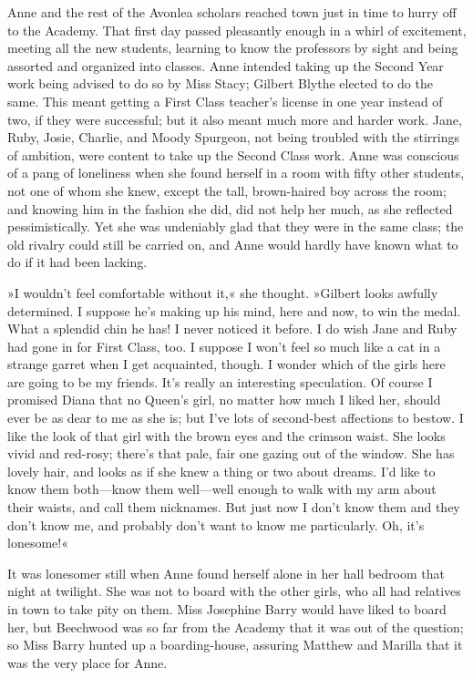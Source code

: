 Anne and the rest of the Avonlea scholars reached town just in time to hurry off to the Academy. That first day passed pleasantly enough in a whirl of excitement, meeting all the new students, learning to know the professors by sight and being assorted and organized into classes. Anne intended taking up the Second Year work being advised to do so by Miss Stacy; Gilbert Blythe elected to do the same. This meant getting a First Class teacher’s license in one year instead of two, if they were successful; but it also meant much more and harder work. Jane, Ruby, Josie, Charlie, and Moody Spurgeon, not being troubled with the stirrings of ambition, were content to take up the Second Class work. Anne was conscious of a pang of loneliness when she found herself in a room with fifty other students, not one of whom she knew, except the tall, brown-haired boy across the room; and knowing him in the fashion she did, did not help her much, as she reflected pessimistically. Yet she was undeniably glad that they were in the same class; the old rivalry could still be carried on, and Anne would hardly have known what to do if it had been lacking.

»I wouldn’t feel comfortable without it,« she thought. »Gilbert looks awfully determined. I suppose he’s making up his mind, here and now, to win the medal. What a splendid chin he has! I never noticed it before. I do wish Jane and Ruby had gone in for First Class, too. I suppose I won’t feel so much like a cat in a strange garret when I get acquainted, though. I wonder which of the girls here are going to be my friends. It’s really an interesting speculation. Of course I promised Diana that no Queen’s girl, no matter how much I liked her, should ever be as dear to me as she is; but I’ve lots of second-best affections to bestow. I like the look of that girl with the brown eyes and the crimson waist. She looks vivid and red-rosy; there’s that pale, fair one gazing out of the window. She has lovely hair, and looks as if she knew a thing or two about dreams. I’d like to know them both—know them well—well enough to walk with my arm about their waists, and call them nicknames. But just now I don’t know them and they don’t know me, and probably don’t want to know me particularly. Oh, it’s lonesome!«

It was lonesomer still when Anne found herself alone in her hall bedroom that night at twilight. She was not to board with the other girls, who all had relatives in town to take pity on them. Miss Josephine Barry would have liked to board her, but Beechwood was so far from the Academy that it was out of the question; so Miss Barry hunted up a boarding-house, assuring Matthew and Marilla that it was the very place for Anne.

